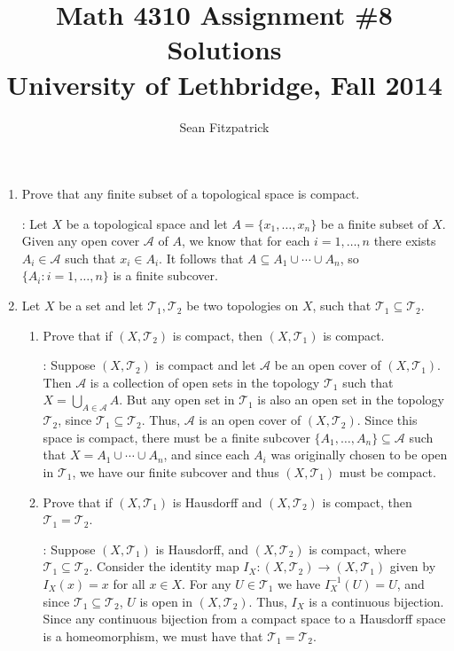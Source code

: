 \documentclass[letterpaper,12pt]{article}
\title{Math 4310 Assignment \#8 Solutions\\University of Lethbridge, Fall 2014}
\author{Sean Fitzpatrick}
\newcommand{\T}{\mathcal{T}}
\newcommand{\A}{\mathcal{A}}
\begin{document}
 \maketitle

\begin{enumerate}
\item Prove that any finite subset of a topological space is compact.

\bigskip

: Let $X$ be a topological space and let $A=\{x_1,\ldots, x_n\}$ be a finite subset of $X$. Given any open cover $\mathcal{A}$ of $A$, we know that for each $i=1,\ldots, n$ there exists $A_i\in\mathcal{A}$ such that $x_i\in A_i$. It follows that $A\subseteq A_1\cup\cdots \cup A_n$, so $\{A_i : i=1,\ldots, n\}$ is a finite subcover.

\bigskip

\item Let $X$ be a set and let $\T_1, \T_2$ be two topologies on $X$, such that $\T_1\subseteq \T_2$.
\begin{enumerate}
 \item Prove that if $(X,\T_2)$ is compact, then $(X,\T_1)$ is compact.

\bigskip

: Suppose $(X,\T_2)$ is compact and let $\A$ be an open cover of $(X,\T_1)$. Then $\A$ is a collection of open sets in the topology $\T_1$ such that $X=\bigcup_{A\in\A}A$. But any open set in $\T_1$ is also an open set in the topology $\T_2$, since $\T_1\subseteq\T_2$. Thus, $\A$ is an open cover of $(X,\T_2)$. Since this space is compact, there must be a finite subcover $\{A_1,\ldots, A_n\}\subseteq \A$ such that $X=A_1\cup\cdots \cup A_n$, and since each $A_i$ was originally chosen to be open in $\T_1$, we have our finite subcover and thus $(X,\T_1)$ must be compact.

\bigskip

 \item Prove that if $(X,\T_1)$ is Hausdorff and $(X,\T_2)$ is compact, then $\T_1=\T_2$.

\bigskip

: Suppose $(X,\T_1)$ is Hausdorff, and $(X,\T_2)$ is compact, where $\T_1\subseteq \T_2$. Consider the identity map $I_X:(X,\T_2)\to (X,\T_1)$ given by $I_X(x)=x$ for all $x\in X$. For any $U\in\T_1$ we have $I_X^{-1}(U)=U$, and since $\T_1\subseteq \T_2$, $U$ is open in $(X,\T_2)$. Thus, $I_X$ is a continuous bijection. Since any continuous bijection from a compact space to a Hausdorff space is a homeomorphism, we must have that $\T_1=\T_2$. 


\end{enumerate}
\end{enumerate}
\end{document}
